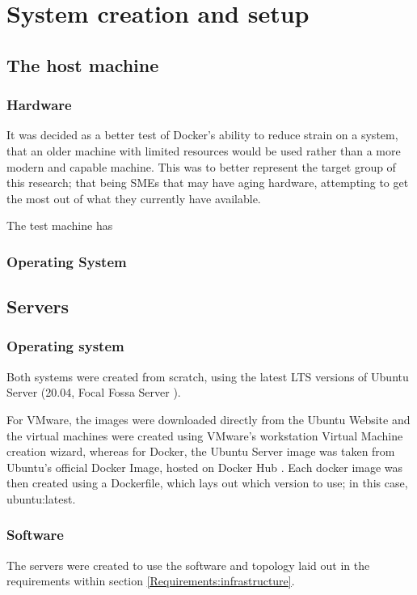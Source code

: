 
\chapter{System creation and setup}
\section{The host machine}
\subsection{Hardware}
It was decided as a better test of Docker's ability to reduce strain on a system, that an older machine with limited resources would be used rather than a more modern and capable machine. This was to better represent the target group of this research; that being SMEs that may have aging hardware, attempting to get the most out of what they currently have available.

The test machine has %

\subsection{Operating System}

\section{Servers}
\subsection{Operating system}
Both systems were created from scratch, using the latest LTS versions of Ubuntu Server (20.04, Focal Fossa Server \citep{UbuntuServerDocumentation}).

For VMware, the images were downloaded directly from the Ubuntu Website and the virtual machines were created using VMware's workstation Virtual Machine creation wizard, whereas for Docker, the Ubuntu Server image was taken from Ubuntu's official Docker Image, hosted on Docker Hub \citep{UbuntuDockerHub}. Each docker image was then created using a Dockerfile, which lays out which version to use; in this case, ubuntu:latest.

\subsection{Software}
The servers were created to use the software and topology laid out in the requirements within section \ref{Requirements:infrastructure}.

